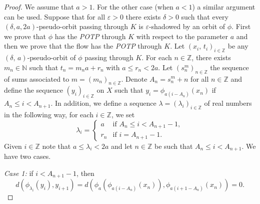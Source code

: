 \documentclass{amsart}
\theoremstyle{definition}
\newcommand{\ep}{\varepsilon}
\begin{document}
\begin{proof}
We assume that $a>1$. For the other case (when $a <1$) a similar argument can be used. Suppose that for all $\ep>0$ there exists $\delta>0$ such that every $(\delta,a,2a)$-pseudo-orbit passing through $K$ is $\ep$-shadowed by an orbit of $\phi$. First we prove that $\phi$ has the {\em POTP} through $K$ with respect to the parameter $a$ and then we prove that the flow has the  {\em POTP} through $K$. Let $(x_i,\,t_i)_{i\in\mathbb{Z}}$ be any $(\delta,\,a)$-pseudo-orbit of $\phi$ passing through $K$. For each $n\in \mathbb{Z}$, there exists $m_n\in \mathbb{N}$ such that $t_n=m_na+r_n$ with $a\leq r_n<2a$. Let $(s_n^m)_{n\in \mathbb{Z}}$ the sequence of sums associated to $m=(m_n)_{n\in \mathbb{Z}}$. Denote $A_n=s_n^m+n$ for all $n\in \mathbb{Z}$ and define the sequence $(y_i)_{i\in \mathbb{Z}}$ on $X$ such that $y_i=\phi_{a(i-A_n)}(x_n)$ if $A_n\leq i<A_{n+1}$. In addition, we define a sequence $\lambda=(\lambda_i)_{i\in \mathbb{Z}}$ of real numbers in the following way, for each $i\in \mathbb{Z}$, we set
$$
\lambda_i = \left\{
\begin{array}{cl}
a &\mbox{if \ } A_n\leq i<A_{n+1}-1,\\
r_n&\mbox{if\ \ } i=A_{n+1}-1.
\end{array}\right.
$$
Given $i\in\mathbb{Z}$ note that $a\leq \lambda_i<2a$ and let $n\in \mathbb{Z}$ be such that $A_n\leq i<A_{n+1}$. We have two cases.

{\em Case 1:} if $i<A_{n+1}-1$, then $$d(\phi_{\lambda_i}(y_i),y_{i+1})=d(\phi_a(\phi_{a(i-A_n)}(x_n)),\phi_{a(i+1-A_n)}(x_n))=0.$$


\end{proof}
\end{document}
